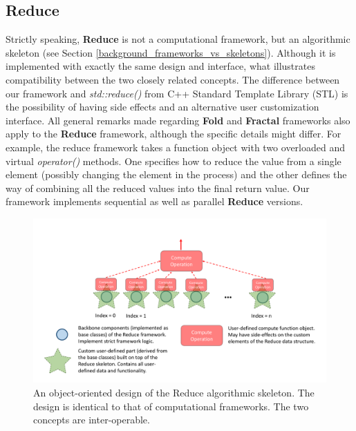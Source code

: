 \subsection{Reduce}
\label{frameworks_reduce}
\quad Strictly speaking, \textbf{Reduce} is not a computational framework, but an algorithmic skeleton (see Section \ref{background_frameworks_vs_skeletons}). Although it is implemented with exactly the same design and interface, what illustrates compatibility between the two closely related concepts. The difference between our framework and \textit{std::reduce()} from C++ Standard Template Library (STL) is the possibility of having side effects and an alternative user customization interface. All general remarks made regarding \textbf{Fold} and \textbf{Fractal} frameworks also apply to the \textbf{Reduce} framework, although the specific details might differ. For example, the reduce framework takes a function object with two overloaded and virtual \textit{operator()} methods. One specifies how to reduce the value from a single element (possibly changing the element in the process) and the other defines the way of combining all the reduced values into the final return value. Our framework implements sequential as well as parallel \textbf{Reduce} versions.
\begin{figure}[ht]
\includegraphics[width=1.0\textwidth]{images/Reduction.pdf}
\caption{An object-oriented design of the Reduce algorithmic skeleton. The design is identical to that of computational frameworks. The two concepts are inter-operable.}
\label{fig:reduce}
\end{figure}
